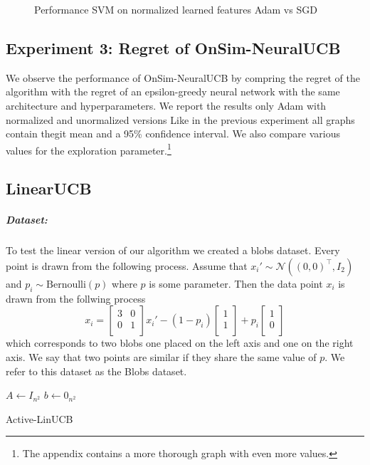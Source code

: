 \documentclass{article}
\begin{document}
\begin{figure}[!h]
\begin{minipage}{.45\textwidth}
  \end{minipage}
  \caption{Performance SVM on normalized learned features Adam vs SGD}\label{fig:l2-loss-normalized-ci}
\end{figure}

\subsection{Experiment 3: Regret of OnSim-NeuralUCB}
We observe the performance of OnSim-NeuralUCB by compring the regret of the algorithm with the regret of an epsilon-greedy
neural network with the same architecture and hyperparameters. We report the results only Adam with normalized and unormalized versions
Like in the previous experiment all graphs contain thegit mean and a 95\% confidence interval. We also compare various values for
the exploration parameter.\footnote{The appendix contains a more thorough graph with even more values.}


\subsection{LinearUCB}
\subparagraph{Dataset:}
To test the linear version of our algorithm we created a blobs dataset.
Every point is drawn from the following process. Assume that $x_i' \sim \mathcal{N}((0, 0)^\top,I_2)$ and $p_i \sim \text{Bernoulli}(p)$ where $p$ is
some parameter.
Then the data point $x_i$ is drawn from the follwing process
\[x_i = \begin{bmatrix} 3 & 0\\ 0 & 1\\ \end{bmatrix} x_i' -(1-p_i)
\begin{bmatrix}
1\\
1\\
\end{bmatrix}
+ p_i
\begin{bmatrix}
1\\
0\\
\end{bmatrix}
\]
which corresponds to two blobs one placed on the left axis and one on the right axis.
We say that two points are similar if they share the same value of $p$.
We refer to this dataset as the Blobs dataset.

\begin{algorithm}
    $A \gets I_{n^2}$\;
    $b \gets 0_{n^2}$\;
    \caption{Active-LinUCB}\label{algo:active-linucb}
\end{algorithm}
\end{document}
